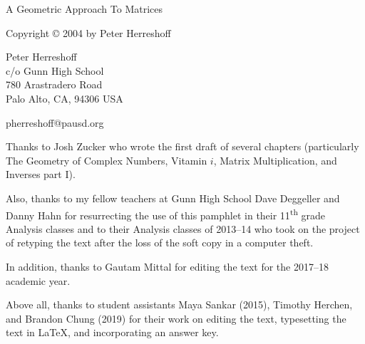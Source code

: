 \documentclass[../gatm.tex]{subfiles}
\begin{document}
\newcommand\dnew{\vspace{1cm}}

\begin{center}
\vspace*{\fill}

\doublespacing
A Geometric Approach To Matrices

Copyright \copyright{} 2004 by Peter Herreshoff

\vspace{1cm}

Peter Herreshoff\\
c/o Gunn High School\\
780 Arastradero Road\\
Palo Alto, CA, 94306 USA

\vspace{.5cm}

pherreshoff@pausd.org

\vspace{1cm}
\end{center}

\noindent Thanks to Josh Zucker who wrote the first draft of several chapters (particularly The Geometry of Complex Numbers, Vitamin $i$, Matrix Multiplication, and Inverses part I).

Also, thanks to my fellow teachers at Gunn High School Dave Deggeller and Danny Hahn for resurrecting the use of this pamphlet in their 11\textsuperscript{th} grade Analysis classes and to their Analysis classes of 2013--14 who took on the project of retyping the text after the loss of the soft copy in a computer theft.

In addition, thanks to Gautam Mittal for editing the text for the 2017--18 academic year.

Above all, thanks to student assistants Maya Sankar (2015), Timothy Herchen, and Brandon Chung (2019) for their work on editing the text, typesetting the text in \LaTeX{}, and incorporating an answer key.

\vspace*{\fill}
\end{document}
